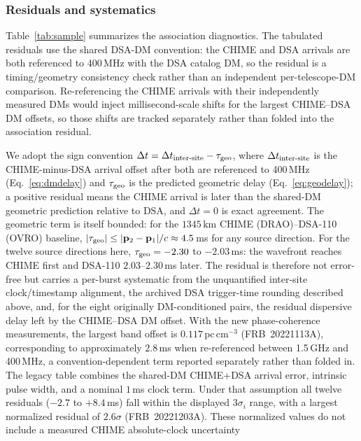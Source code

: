 \subsubsection{Residuals and systematics}

Table~\ref{tab:sample} summarizes the association diagnostics. The tabulated
residuals use the shared DSA-DM convention: the CHIME and DSA arrivals are both
referenced to 400\,MHz with the DSA catalog DM, so the residual is a
timing/geometry consistency check rather than an independent per-telescope-DM
comparison. Re-referencing the CHIME arrivals with their independently measured
DMs would inject millisecond-scale shifts for the largest CHIME--DSA DM offsets,
so those shifts are tracked separately rather than folded into the association
residual.

We adopt the sign convention $\Delta t = \Delta t_{\rm inter\text{-}site} -
\tau_{\rm geo}$, where $\Delta t_{\rm inter\text{-}site}$ is the CHIME-minus-DSA
arrival offset after both are referenced to 400\,MHz (Eq.~\ref{eq:dmdelay}) and
$\tau_{\rm geo}$ is the predicted geometric delay (Eq.~\ref{eq:geodelay}); a
positive residual means the CHIME arrival is later than the shared-DM geometric
prediction relative to DSA, and $\Delta t=0$ is exact agreement. The geometric
term is itself bounded: for the $1345\,\mathrm{km}$ CHIME (DRAO)--DSA-110 (OVRO)
baseline, $|\tau_{\rm geo}| \le |\mathbf{p}_2-\mathbf{p}_1|/c \approx 4.5\,$ms for
any source direction. For the twelve source directions here,
$\tau_{\rm geo}=-2.30$ to $-2.03\,$ms: the wavefront reaches CHIME first and
DSA-110 $2.03$--$2.30\,$ms later. The residual is therefore not error-free but carries a
per-burst systematic from the unquantified inter-site clock/timestamp
alignment, the archived DSA trigger-time rounding described above, and, for
the eight originally DM-conditioned pairs, the residual dispersive delay left
by the CHIME--DSA DM offset. With the new phase-coherence measurements, the
largest band offset is
$0.117\,\mathrm{pc\,cm^{-3}}$ (FRB~20221113A), corresponding to approximately
$2.8$\,ms when re-referenced between 1.5\,GHz and 400\,MHz,
a convention-dependent term reported separately rather than folded in. The
legacy table combines the shared-DM CHIME+DSA arrival error, intrinsic pulse
width, and a nominal $1$\,ms clock term. Under that assumption all twelve
residuals ($-2.7$ to $+8.4$\,ms) fall within the displayed $3\sigma_i$ range,
with a largest normalized residual of $2.6\sigma$ (FRB~20221203A). These
normalized values do not include a measured CHIME absolute-clock uncertainty
